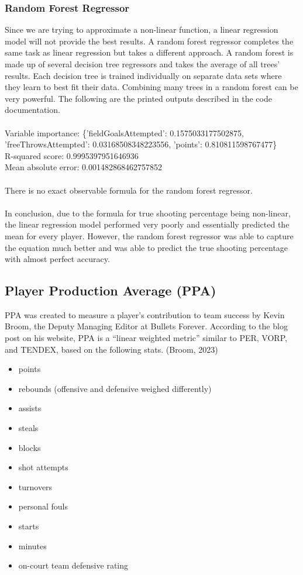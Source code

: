\documentclass{article}
\begin{document}
\subsubsection*{Random Forest Regressor}
Since we are trying to approximate a non-linear function, a linear regression model will not provide the best results. A random forest regressor completes the same task as linear regression but takes a different approach. A random forest is made up of several decision tree regressors and takes the average of all trees' results. Each decision tree is trained individually on separate data sets where they learn to best fit their data. Combining many trees in a random forest can be very powerful. The following are the printed outputs described in the code documentation.\\ \\
Variable importance: \{'fieldGoalsAttempted': 0.1575033177502875, 'freeThrowsAttempted': 0.03168508348223556, 'points': 0.810811598767477\}\\
R-squared score: 0.9995397951646936\\
Mean absolute error: 0.001482868462757852\\ \\
There is no exact observable formula for the random forest regressor.\\ \\
In conclusion, due to the formula for true shooting percentage being non-linear, the linear regression model performed very poorly and essentially predicted the mean for every player. However, the random forest regressor was able to capture the equation much better and was able to predict the true shooting percentage with almost perfect accuracy.
\subsection{Player Production Average (PPA)}
PPA was created to measure a player’s contribution to team success by Kevin Broom, the Deputy Managing Editor at Bullets Forever. According to the blog post on his website, PPA is a “linear weighted metric” similar to PER, VORP, and TENDEX, based on the following stats. (Broom, 2023)
\begin{itemize}
    \item points
    \item rebounds (offensive and defensive weighed differently)
    \item assists
    \item steals
    \item blocks
    \item shot attempts
    \item turnovers
    \item personal fouls
    \item starts
    \item minutes
    \item on-court team defensive rating
\end{itemize}
\end{document}
